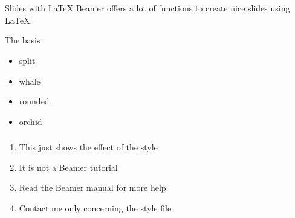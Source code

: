 \documentclass{article}
\begin{document}
\section{ }

\begin{frame}
  \frametitle{ }
	\begin{block}{Slides with \LaTeX}
	    Beamer offers a lot of functions to create nice slides using \LaTeX.
	  \end{block}
	
	  \begin{block}{The basis}
	     
	    \begin{itemize}
	      \item split
	      \item whale
	      \item rounded
	      \item orchid
	    \end{itemize}
	  \end{block}
\end{frame}
\begin{frame}
  \frametitle{ }
	 \begin{enumerate}
	    \item This just shows the effect of the style
	    \item It is not a Beamer tutorial
	    \item Read the Beamer manual for more help
	    \item Contact me only concerning the style file
	  \end{enumerate}
\end{frame}
\end{document}
